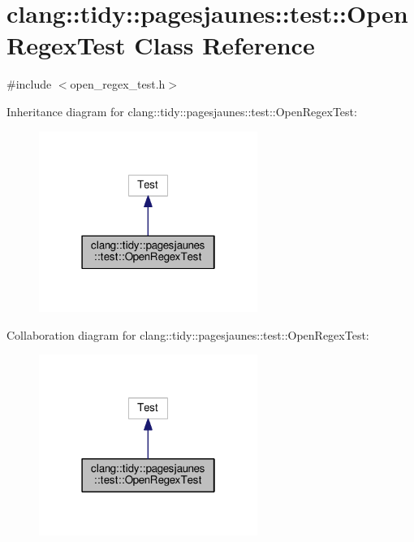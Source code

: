 \hypertarget{classclang_1_1tidy_1_1pagesjaunes_1_1test_1_1_open_regex_test}{}\section{clang\+:\+:tidy\+:\+:pagesjaunes\+:\+:test\+:\+:Open\+Regex\+Test Class Reference}
\label{classclang_1_1tidy_1_1pagesjaunes_1_1test_1_1_open_regex_test}


{\ttfamily \#include $<$open\+\_\+regex\+\_\+test.\+h$>$}



Inheritance diagram for clang\+:\+:tidy\+:\+:pagesjaunes\+:\+:test\+:\+:Open\+Regex\+Test\+:
\nopagebreak
\begin{figure}[H]
\begin{center}
\leavevmode
\includegraphics[width=202pt]{classclang_1_1tidy_1_1pagesjaunes_1_1test_1_1_open_regex_test__inherit__graph}
\end{center}
\end{figure}


Collaboration diagram for clang\+:\+:tidy\+:\+:pagesjaunes\+:\+:test\+:\+:Open\+Regex\+Test\+:
\nopagebreak
\begin{figure}[H]
\begin{center}
\leavevmode
\includegraphics[width=202pt]{classclang_1_1tidy_1_1pagesjaunes_1_1test_1_1_open_regex_test__coll__graph}
\end{center}
\end{figure}

